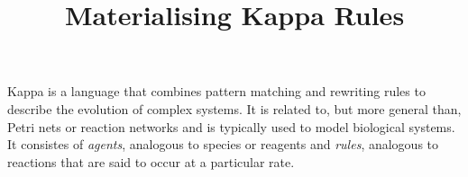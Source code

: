 \documentclass{amsart}
\title{Materialising Kappa Rules}
\begin{document}
\maketitle

Kappa is a language that combines pattern matching and rewriting
rules to describe the evolution of complex systems. It is related to,
but more general than, Petri nets or reaction networks and is
typically used to model biological systems. It consistes of
\emph{agents}, analogous to species or reagents and \emph{rules},
analogous to reactions that are said to occur at a particular
rate.



\end{document}
